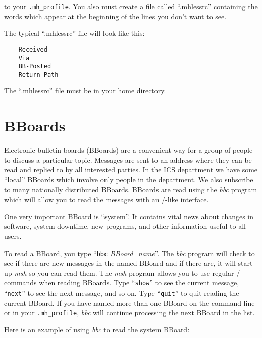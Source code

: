 
to your \verb|.mh_profile|. You also must create a file 
called ``.mhlessrc'' containing the words which
appear at the beginning of the lines you don't want to see.
 
The typical ``.mhlessrc'' file will look like this:
\begin{verbatim}
	Received
	Via
	BB-Posted
	Return-Path
\end{verbatim}

The ``.mhlessrc'' file must be in your home directory.


\section{BBoards}

Electronic bulletin boards (BBoards) are a convenient way for a group
of people to discuss a particular topic.  Messages are sent to
an address where they can be read and replied to by all interested
parties. In the ICS department we have some ``local'' BBoards which
involve only people in the department.  We also subscribe to many
nationally distributed BBoards.  BBoards are read using the {\it bbc\/}
program which will allow you to read the messages with
an \MH/-like interface. 

One very important BBoard is ``system''.
It contains vital news about changes in software, system
downtime, new programs, and other information useful to all users.

To read a BBoard, you type ``\verb|bbc| {\it BBoard\_name\/}''. The {\it
bbc\/} program will check to see if there are new messages in the named
BBoard and if there are, it will start up {\it msh\/} so you can read them.
The {\it msh\/} program allows you to use regular \MH/ commands when reading
BBoards. Type ``{\tt show}'' to see the current message, ``{\tt next}'' to
see the next message, and so on.  Type ``{\tt quit}'' to quit reading the
current BBoard. If you have named more than one BBoard on the command line
or in your \verb|.mh_profile|, {\it bbc\/} will continue processing the next
BBoard in the list.

Here is an example of using {\it bbc\/} to read the system BBoard:

